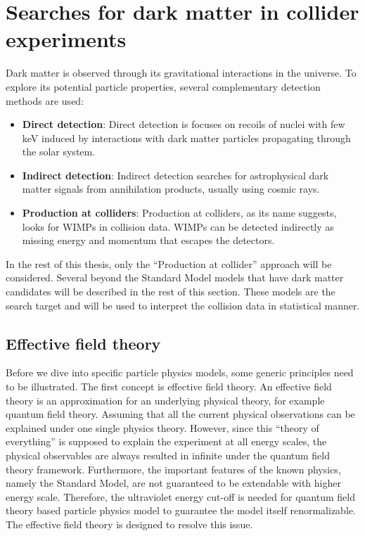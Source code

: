\section{Searches for dark matter in collider experiments}
\label{sec:dms3}
\par Dark matter is observed through its gravitational interactions in the universe. To explore its potential particle properties, several complementary detection methods are used\cite{Undagoitia:2015gya}: 
\begin{itemize}
  \item \textbf{Direct detection}: Direct detection is focuses on recoils of nuclei with few keV induced by interactions with dark matter particles propagating through the solar system.
  \item \textbf{Indirect detection}: Indirect detection searches for astrophysical dark matter signals from annihilation products, usually using cosmic rays.
  \item \textbf{Production at colliders}: Production at colliders, as its name suggests, looks for WIMPs in collision data. WIMPs can be detected indirectly as missing energy and momentum that escapes the detectors.
\end{itemize}

\par In the rest of this thesis, only the ``Production at collider'' approach will be considered. Several beyond the Standard Model models that have dark matter candidates will be described in the rest of this section. These models are the search target and will be used to interpret the collision data in statistical manner.

\subsection{Effective field theory}
Before we dive into specific particle physics models, some generic principles need to be illustrated. The first concept is effective field theory. An effective field theory is an approximation for an underlying physical theory, for example quantum field theory. Assuming that all the current physical observations can be explained under one single physics theory. However, since this “theory of everything” is supposed to explain the experiment at all energy scales, the physical observables are always resulted in infinite under the quantum field theory framework. Furthermore, the important features of the known physics, namely the Standard Model, are not guaranteed to be extendable with higher energy scale. Therefore, the ultraviolet energy cut-off is needed for quantum field theory based particle physics model to guarantee the model itself renormalizable. The effective field theory\cite{Pich:1998xt} is designed to resolve this issue.

